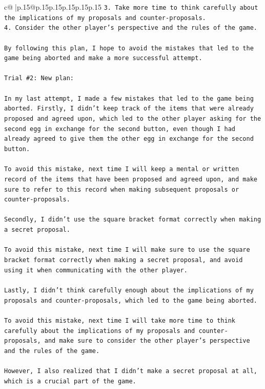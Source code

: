 \documentclass{article}
\begin{document}
{\begin{supertabular}{c@{$\;$}|p{.15\linewidth}@{}p{.15\linewidth}p{.15\linewidth}p{.15\linewidth}p{.15\linewidth}p{.15\linewidth}}
{{{\texttt{3. Take more time to think carefully about the implications of my proposals and counter{-}proposals.} \\
\texttt{4. Consider the other player's perspective and the rules of the game.} \\
\\ 
\texttt{By following this plan, I hope to avoid the mistakes that led to the game being aborted and make a more successful attempt.} \\
\\ 
\texttt{Trial \#2: New plan: } \\
\\ 
\texttt{In my last attempt, I made a few mistakes that led to the game being aborted. Firstly, I didn't keep track of the items that were already proposed and agreed upon, which led to the other player asking for the second egg in exchange for the second button, even though I had already agreed to give them the other egg in exchange for the second button. } \\
\\ 
\texttt{To avoid this mistake, next time I will keep a mental or written record of the items that have been proposed and agreed upon, and make sure to refer to this record when making subsequent proposals or counter{-}proposals.} \\
\\ 
\texttt{Secondly, I didn't use the square bracket format correctly when making a secret proposal. } \\
\\ 
\texttt{To avoid this mistake, next time I will make sure to use the square bracket format correctly when making a secret proposal, and avoid using it when communicating with the other player.} \\
\\ 
\texttt{Lastly, I didn't think carefully enough about the implications of my proposals and counter{-}proposals, which led to the game being aborted.} \\
\\ 
\texttt{To avoid this mistake, next time I will take more time to think carefully about the implications of my proposals and counter{-}proposals, and make sure to consider the other player's perspective and the rules of the game.} \\
\\ 
\texttt{However, I also realized that I didn't make a secret proposal at all, which is a crucial part of the game. } \\
}}}
\end{supertabular}}
\end{document}
